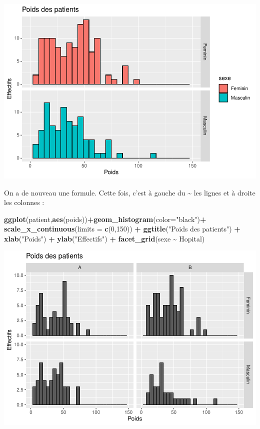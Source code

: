 \documentclass[
]{book}
\newenvironment{Shaded}{\begin{snugshade}}{\end{snugshade}}
\newcommand{\AttributeTok}[1]{\textcolor[rgb]{0.13,0.29,0.53}{#1}}
\newcommand{\DecValTok}[1]{\textcolor[rgb]{0.00,0.00,0.81}{#1}}
\newcommand{\FunctionTok}[1]{\textcolor[rgb]{0.13,0.29,0.53}{\textbf{#1}}}
\newcommand{\NormalTok}[1]{#1}
\newcommand{\SpecialCharTok}[1]{\textcolor[rgb]{0.81,0.36,0.00}{\textbf{#1}}}
\newcommand{\StringTok}[1]{\textcolor[rgb]{0.31,0.60,0.02}{#1}}
\begin{document}
\includegraphics{_main_files/figure-latex/ggplot9-1.pdf}

On a de nouveau une formule. Cette fois, c'est à gauche du \textasciitilde{} les lignes et
à droite les colonnes :

\begin{Shaded}
\begin{Highlighting}[]
\FunctionTok{ggplot}\NormalTok{(patient,}\FunctionTok{aes}\NormalTok{(poids))}\SpecialCharTok{+}\FunctionTok{geom\_histogram}\NormalTok{(}\AttributeTok{color=}\StringTok{"black"}\NormalTok{)}\SpecialCharTok{+}
  \FunctionTok{scale\_x\_continuous}\NormalTok{(}\AttributeTok{limits =} \FunctionTok{c}\NormalTok{(}\DecValTok{0}\NormalTok{,}\DecValTok{150}\NormalTok{)) }\SpecialCharTok{+} 
  \FunctionTok{ggtitle}\NormalTok{(}\StringTok{"Poids des patients"}\NormalTok{) }\SpecialCharTok{+} 
  \FunctionTok{xlab}\NormalTok{(}\StringTok{"Poids"}\NormalTok{) }\SpecialCharTok{+} 
  \FunctionTok{ylab}\NormalTok{(}\StringTok{"Effectifs"}\NormalTok{) }\SpecialCharTok{+}
  \FunctionTok{facet\_grid}\NormalTok{(sexe }\SpecialCharTok{\textasciitilde{}}\NormalTok{ Hopital)}
\end{Highlighting}
\end{Shaded}

\includegraphics{_main_files/figure-latex/ggplot10-1.pdf}
\end{document}
